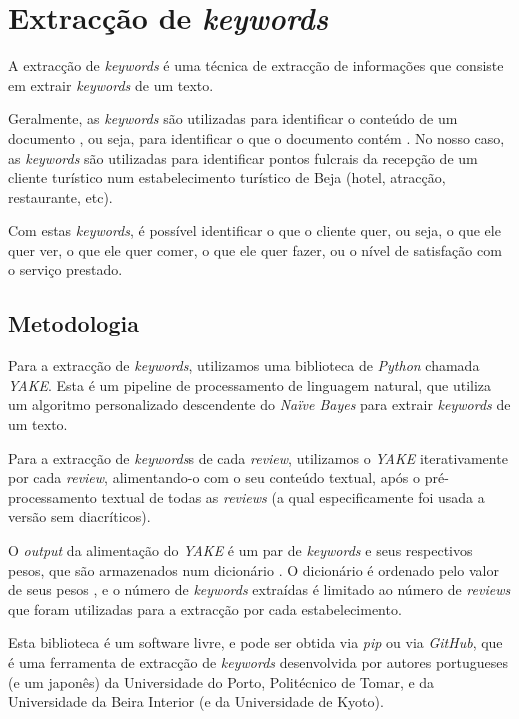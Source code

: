 \chapter{Extracção de \textit{keywords}}
\label{cap5}

A extracção de \textit{keywords} é uma técnica de extracção de informações que consiste em extrair \textit{keywords} de um texto.

Geralmente, as \textit{keywords} são utilizadas para identificar o conteúdo de um documento \cite{tamyt1}, ou seja, para identificar o que o documento contém \cite{tamyt2}. No nosso caso, as \textit{keywords} são utilizadas para identificar pontos fulcrais da recepção de um cliente turístico num estabelecimento turístico de Beja (hotel, atracção, restaurante, etc).

Com estas \textit{keywords}, é possível identificar o que o cliente quer, ou seja, o que ele quer ver, o que ele quer comer, o que ele quer fazer, ou o nível de satisfação com o serviço prestado.

\section{Metodologia}

Para a extracção de \textit{keywords}, utilizamos uma biblioteca de \textit{Python} chamada \textit{YAKE}. Esta é um pipeline de processamento de linguagem natural, que utiliza um algoritmo personalizado descendente do \textit{Naïve Bayes} para extrair \textit{keywords} de um texto.

Para a extracção de \textit{keywords}s de cada \textit{review}, utilizamos o \textit{YAKE} iterativamente por cada \textit{review}, alimentando-o com o seu conteúdo textual, após o pré-processamento textual de todas as \textit{reviews} (a qual especificamente foi usada a versão sem diacríticos).

O \textit{output} da alimentação do \textit{YAKE} é um par de \textit{keywords} e seus respectivos pesos, que são armazenados num dicionário \cite{tamgh1}. O dicionário é ordenado pelo valor de seus pesos \cite{tamyt3}, e o número de \textit{keywords} extraídas é limitado ao número de \textit{reviews} que foram utilizadas para a extracção por cada estabelecimento.


Esta biblioteca é um software livre, e pode ser obtida via \textit{pip} ou via \textit{GitHub}, que é uma ferramenta de extracção de \textit{keywords} desenvolvida por autores portugueses (e um japonês) da Universidade do Porto, Politécnico de Tomar, e da Universidade da Beira Interior (e da Universidade de Kyoto).

